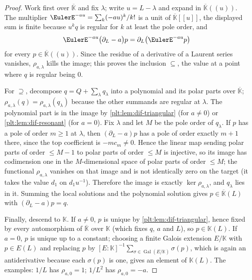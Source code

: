 \documentclass[11pt,oneside]{article}
\theoremstyle{plain}
\theoremstyle{definition}
\theoremstyle{remark}
\newcommand{\K}{\mathbb{K}}
\begin{document}
\begin{proof}
Work first over \(\overline{\K}\) and fix \(\lambda\); write \(u=L-\lambda\)
and expand in \(\overline{\K}((u))\).  The multiplier
\(\EulerE^{-au}=\sum_{k}(-au)^{k}/k!\) is a unit of
\(\overline{\K}[[u]]\), the displayed sum is finite because \(u^{k}q\) is
regular for \(k\) at least the pole order, and
\[
  \EulerE^{-au}\bigl(\partial_{L}-a\bigr)p
  =\partial_{L}\bigl(\EulerE^{-au}p\bigr)
\]
for every \(p\in\overline{\K}((u))\).  Since the residue of a derivative of a
Laurent series vanishes, \(\rho_{a,\lambda}\) kills the image; this proves the
inclusion \(\subseteq\), the value at a point where \(q\) is regular being
\(0\).

For \(\supseteq\), decompose \(q=Q+\sum_{\lambda}q_{\lambda}\) into a
polynomial and its polar parts over \(\overline{\K}\); \(\rho_{a,\lambda}(q)
=\rho_{a,\lambda}(q_{\lambda})\) because the other summands are regular at
\(\lambda\).  The polynomial part is in the image by
\cref{plt:lem:dif-triangular} (for \(a\ne0\)) or
\cref{plt:lem:dif-resonant} (for \(a=0\)).  Fix \(\lambda\) and let \(M\) be
the pole order of \(q_{\lambda}\).  If \(p\) has a pole of order \(m\ge1\) at
\(\lambda\), then \((\partial_{L}-a)p\) has a pole of order exactly \(m+1\)
there, since the top coefficient is \(-mc_{m}\ne0\).  Hence the linear map
sending polar parts of order \(\le M-1\) to polar parts of order \(\le M\) is
injective, so its image has codimension one in the \(M\)-dimensional space of
polar parts of order \(\le M\); the functional \(\rho_{a,\lambda}\) vanishes on
that image and is not identically zero on the target (it takes the value
\(d_{1}\) on \(d_{1}u^{-1}\)).  Therefore the image is exactly
\(\ker\rho_{a,\lambda}\), and \(q_{\lambda}\) lies in it.  Summing the local
solutions and the polynomial solution gives \(p\in\overline{\K}(L)\) with
\((\partial_{L}-a)p=q\).

Finally, descend to \(\K\).  If \(a\ne0\), \(p\) is unique by
\cref{plt:lem:dif-triangular}, hence fixed by every automorphism of
\(\overline{\K}\) over \(\K\) (which fixes \(q\), \(a\) and \(L\)), so
\(p\in\K(L)\).  If \(a=0\), \(p\) is unique up to a constant; choosing a finite
Galois extension \(E/\K\) with \(p\in E(L)\) and replacing \(p\) by
\([E:\K]^{-1}\sum_{\sigma\in\operatorname{Gal}(E/\K)}\sigma(p)\), which is
again an antiderivative because each \(\sigma(p)\) is one, gives an element of
\(\K(L)\).  The examples: \(1/L\) has \(\rho_{a,0}=1\); \(1/L^{2}\) has
\(\rho_{a,0}=-a\).
\end{proof}
\end{document}
